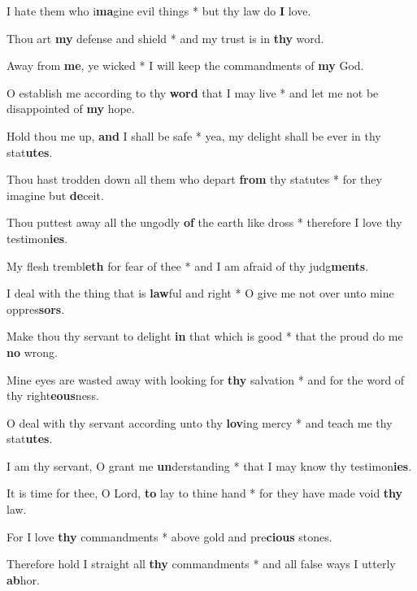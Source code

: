 \begin{multicols}{2}
	I hate them who i\textbf{ma}gine evil things * but thy law do \textbf{I} love.
	
	Thou art \textbf{my} defense and shield * and my trust is in \textbf{thy} word.
	
	Away from \textbf{me}, ye wicked * I will keep the commandments of \textbf{my} God.
	
	O establish me according to thy \textbf{word} that I may live * and let me not be disappointed of \textbf{my} hope.
	
	Hold thou me up, \textbf{and} I shall be safe * yea, my delight shall be ever in thy stat\textbf{utes}.
	
	Thou hast trodden down all them who depart \textbf{from} thy statutes * for they imagine but \textbf{de}ceit.
	
	Thou puttest away all the ungodly \textbf{of} the earth like dross * therefore I love thy testimon\textbf{ies}.
	
	My flesh trembl\textbf{eth} for fear of thee * and I am afraid of thy judg\textbf{ments}.
	
	I deal with the thing that is \textbf{law}ful and right * O give me not over unto mine oppres\textbf{sors}.
	
	Make thou thy servant to delight \textbf{in} that which is good * that the proud do me \textbf{no} wrong.
	
	Mine eyes are wasted away with looking for \textbf{thy} salvation * and for the word of thy right\textbf{eous}ness.
	
	O deal with thy servant according unto thy \textbf{lov}ing mercy * and teach me thy stat\textbf{utes}.
	
	I am thy servant, O grant me \textbf{un}derstanding * that I may know thy testimon\textbf{ies}.
	
	It is time for thee, O Lord, \textbf{to} lay to thine hand * for they have made void \textbf{thy} law.
	
	For I love \textbf{thy} commandments * above gold and pre\textbf{cious} stones.
	
	Therefore hold I straight all \textbf{thy} commandments * and all false ways I utterly \textbf{ab}hor. 
\end{multicols}
